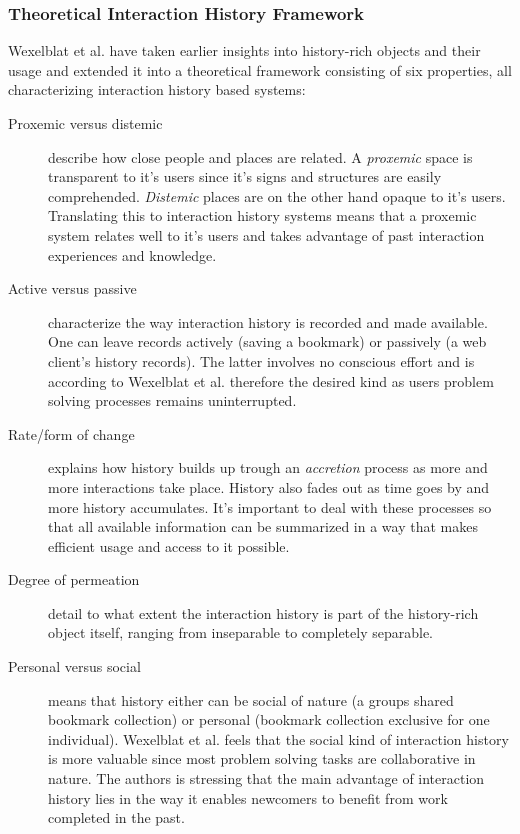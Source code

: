 \documentclass[12pt,a4paper]{article}
\begin{document}
\subsubsection{Theoretical Interaction History Framework}

Wexelblat et al. have taken earlier insights into history-rich objects and
their usage \cite{hill92, hill94} and extended it into a theoretical framework
consisting of six properties, all characterizing interaction history based
systems:

\begin{description}
  \item[Proxemic versus distemic] describe how close people and places are
    related. A \emph{proxemic} space is transparent to it's users since it's
    signs and structures are easily comprehended. \emph{Distemic} places are on
    the other hand opaque to it's users. Translating this to interaction
    history systems means that a proxemic system relates well to it's users
    and takes advantage of past interaction experiences and knowledge.
  \item[Active versus passive] characterize the way interaction history is
    recorded and made available. One can leave records actively (saving a
    bookmark) or passively (a web client's history records). The latter
    involves no
    conscious effort and is according to Wexelblat et al. therefore the desired
    kind as users problem solving processes remains uninterrupted.
  \item[Rate/form of change] explains how history builds up trough an
    \emph{accretion} process as more and more interactions take place. History
    also fades out as time goes by and more history accumulates. It's important
    to deal with these processes so that all available information can be
    summarized in a way that makes efficient usage and access to it possible.
  \item[Degree of permeation] detail to what extent the interaction history is
    part of the history-rich object itself, ranging from inseparable to
    completely separable.
  \item[Personal versus social] means that history either can be social of
    nature (a groups shared bookmark collection) or personal (bookmark
    collection exclusive for one individual). Wexelblat et al. feels that
    the social kind of interaction history is more valuable since most problem
    solving tasks are collaborative in nature. The authors is stressing that
    the main advantage of interaction history lies in the way it enables
    newcomers to benefit from work completed in the past.
    

\end{description}
\end{document}
